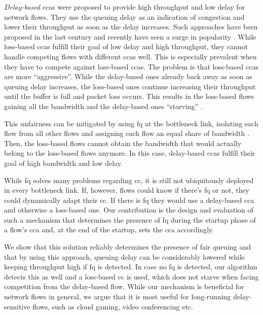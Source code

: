 \documentclass[runningheads]{llncs}
\begin{document}
\textit{Delay-based} \glspl{cca} were proposed to provide high throughput and low delay for network flows. They use the queuing delay as an indication of congestion and lower their throughput as soon as the delay increases. Such approaches have been proposed in the last century \cite{brakmo_tcp_1995} and recently have seen a surge in popularity \cite{arun_copa_2018,hock_tcp_2017,mittal_timely_2015,cardwell_bbr:_2016}. While loss-based \glspl{cca} fulfill their goal of low delay and high throughput, they cannot handle competing flows with different \glspl{cca} well. This is especially prevalent when they have to compete against loss-based \glspl{cca}. The problem is that loss-based \glspl{cca} are more ``aggressive''. While the delay-based ones already back away as soon as queuing delay increases, the loss-based ones continue increasing their throughput until the buffer is full and packet loss occurs. This results in the loss-based flows gaining all the bandwidth and the delay-based ones ``starving'' \cite{hock_toward_2016,yuan-cheng_lai_improving_2001,awdeh_comparing_2004}.

This unfairness can be mitigated by using \gls{fq} at the bottleneck link, isolating each flow from all other flows and assigning each flow an equal share of bandwidth \cite{dumazet_pkt_sched:_2013}. Then, the loss-based flows cannot obtain the bandwidth that would actually belong to the loss-based flows anymore. In this case, delay-based \glspl{cca} fulfill their goal of high bandwidth and low delay. 

While \gls{fq} solves many problems regarding \gls{cc}, it is still not ubiquitously deployed in every bottleneck link. If, however, flows could know if there's \gls{fq} or not, they could dynamically adapt their \gls{cc}. If there is \gls{fq} they would use a delay-based \gls{cca} and otherwise a loss-based one. Our contribution is the design and evaluation of such a mechanism that determines the presence of \gls{fq} during the startup phase of a flow's \gls{cca} and, at the end of the startup, sets the \gls{cca} accordingly. 

We show that this solution reliably determines the presence of fair queuing and that by using this approach, queuing delay can be considerably lowered while keeping throughput high if \gls{fq} is detected. In case no \gls{fq} is detected, our algorithm detects this as well and a loss-based \gls{cc} is used, which does not starve when facing competition from the delay-based flow. While our mechanism is beneficial for network flows in general, we argue that it is most useful for long-running delay-sensitive flows, such as cloud gaming, video conferencing etc. 
\end{document}

